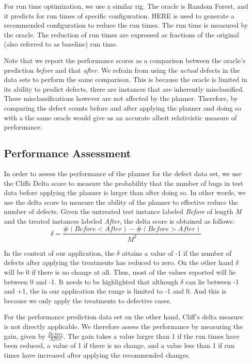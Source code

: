 \documentclass[conference]{IEEEtran}
\begin{document}
For run time optimization, we use a similar rig. The oracle is Random Forest, and it predicts for run times of specific configuration. HERE is used to generate a recommended configuration to reduce the run times. The run time is measured by the oracle. The reduction of run times are expressed as fractions of the original (also referred to as baseline) run time.

Note that we report the performance scores as a comparison between the oracle's prediction \textit{before} and that \textit{after}. We refrain from using the \textit{actual} defects in the data sets to perform the same comparison. This is because the oracle is limited in its ability to predict defects, there are instances that are inherently misclassified. These misclassifications however are not affected by the planner. Therefore, by comparing the defect counts before and after applying the planner and doing so with a the same oracle would give us an accurate albeit relativistic measure of performance.


\subsection{Performance Assessment}

In order to assess the performance of the planner for the defect data set, we use the Cliffs Delta score to measure the probability that the number of bugs in test data before applying the planner is larger than after doing so. In other words, we use the delta score to measure the ability of the planner to effective reduce the number of defects. Given the untreated test instance labeled \textit{Before} of length \textit{M} and the treated instances labeled \textit{After}, the delta score is obtained as follows:
\begin{equation}
\delta = \frac{\#(Before<After) - \#(Before>After)}{M^2}
\label{eq:cliffs}
\end{equation}

In the context of our application, the $\delta$ attains a value of -1 if the number of defects after applying the treatments has reduced to zero. On the other hand $\delta$ will be 0 if there is no change at all. Thus, most of the values reported will lie between 0 and -1. It needs to be highlighted that although $\delta$ can lie between -1 and +1, the in our application the range is limited to -1 and 0. And this is because we only apply the treatments to defective cases. 

For the performance prediction data set on the other hand, Cliff's delta measure is not directly applicable. We therefore assess the performance by measuring the gain, given by $\frac{Before}{After}$. The gain takes a value larger than 1 if the run times have been reduced, a value of 1 if there is no change, and a value less than 1 if run times have increased after applying the recommended changes. 
\end{document}
